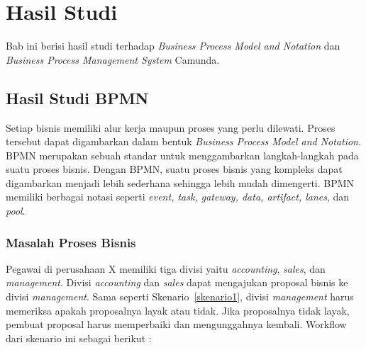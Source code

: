 \chapter{Hasil Studi}
\label{chap:studi}
Bab ini berisi hasil studi terhadap \textit{Business Process Model and Notation} dan \textit{Business Process Management System} Camunda. 

\section{Hasil Studi BPMN}
\label{sec:studibpmn}
Setiap bisnis memiliki alur kerja maupun proses yang perlu dilewati. Proses tersebut dapat digambarkan dalam bentuk \textit{Business Process Model and Notation}. BPMN merupakan sebuah standar untuk menggambarkan langkah-langkah pada suatu proses bisnis. Dengan BPMN, suatu proses bisnis yang kompleks dapat digambarkan menjadi lebih sederhana sehingga lebih mudah dimengerti. BPMN memiliki berbagai notasi seperti \textit{event, task, gateway, data, artifact, lanes}, dan \textit{pool}.  



\subsection{Masalah Proses Bisnis}
\label{masalah}
Pegawai di perusahaan X memiliki tiga divisi yaitu \textit{accounting}, \textit{sales}, dan \textit{management}. Divisi \textit{accounting} dan \textit{sales} dapat mengajukan proposal bisnis ke divisi \textit{management}. Sama seperti Skenario~\ref{skenario1}, divisi \textit{management} harus memeriksa apakah proposalnya layak atau tidak. Jika proposalnya tidak layak, pembuat proposal harus memperbaiki dan mengunggahnya kembali. Workflow dari skenario ini sebagai berikut :

